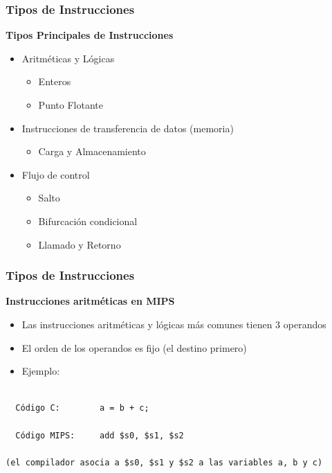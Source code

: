 \documentclass[aspectratio=169,compress]{beamer}
\begin{document}
\begin{footnotesize}
\begin{frame}
\frametitle{Tipos de Instrucciones}
\begin{center}\textbf{Tipos Principales de Instrucciones}\end{center}
\begin{itemize}
\item Aritméticas y Lógicas
\begin{itemize}
\item Enteros
\item Punto Flotante
\end{itemize}
\item Instrucciones de transferencia de datos (memoria)
\begin{itemize}
\item Carga y Almacenamiento
\end{itemize}
\item Flujo de control
\begin{itemize}
\item Salto
\item Bifurcación condicional
\item Llamado y Retorno
\end{itemize}
\end{itemize}
\end{frame}



\begin{frame}[fragile]
\frametitle{Tipos de Instrucciones}
\begin{center}\textbf{Instrucciones aritméticas en MIPS}\end{center}
\begin{itemize}
\item Las instrucciones aritméticas y lógicas más comunes tienen 3 operandos
\item El orden de los operandos es fijo (el destino primero)
\item Ejemplo:
\end{itemize}

\begin{verbatim}

  Código C:        a = b + c;

  Código MIPS:     add $s0, $s1, $s2

(el compilador asocia a $s0, $s1 y $s2 a las variables a, b y c)

\end{verbatim}

\end{frame}




\end{footnotesize}
\end{document}
